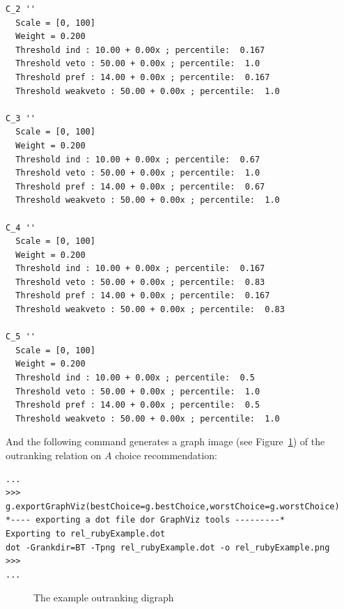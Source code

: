 \documentclass{article}
\newcommand{\+}{\verb+}
\renewcommand{\*}{\back{}}
\newcommand{\Ruby}{{\texorhtml{\sc{Rubis}}{\emph{Rubis}}}\xspace }
\begin{document}
\begin{center}
\begin{example}
\begin{verbatim}
C_2 ''
  Scale = [0, 100]
  Weight = 0.200 
  Threshold ind : 10.00 + 0.00x ; percentile:  0.167
  Threshold veto : 50.00 + 0.00x ; percentile:  1.0
  Threshold pref : 14.00 + 0.00x ; percentile:  0.167
  Threshold weakveto : 50.00 + 0.00x ; percentile:  1.0

C_3 ''
  Scale = [0, 100]
  Weight = 0.200 
  Threshold ind : 10.00 + 0.00x ; percentile:  0.67
  Threshold veto : 50.00 + 0.00x ; percentile:  1.0
  Threshold pref : 14.00 + 0.00x ; percentile:  0.67
  Threshold weakveto : 50.00 + 0.00x ; percentile:  1.0

C_4 ''
  Scale = [0, 100]
  Weight = 0.200 
  Threshold ind : 10.00 + 0.00x ; percentile:  0.167
  Threshold veto : 50.00 + 0.00x ; percentile:  0.83
  Threshold pref : 14.00 + 0.00x ; percentile:  0.167
  Threshold weakveto : 50.00 + 0.00x ; percentile:  0.83

C_5 ''
  Scale = [0, 100]
  Weight = 0.200 
  Threshold ind : 10.00 + 0.00x ; percentile:  0.5
  Threshold veto : 50.00 + 0.00x ; percentile:  1.0
  Threshold pref : 14.00 + 0.00x ; percentile:  0.5
  Threshold weakveto : 50.00 + 0.00x ; percentile:  1.0

\end{verbatim}
\end{example}

And the following  command generates a graph image (see Figure~\ref{fig:ruby}) of the outranking relation on $A$ \Ruby choice recommendation: 
\begin{example}
\begin{verbatim}
...
>>> g.exportGraphViz(bestChoice=g.bestChoice,worstChoice=g.worstChoice)
*---- exporting a dot file dor GraphViz tools ---------*
Exporting to rel_rubyExample.dot
dot -Grankdir=BT -Tpng rel_rubyExample.dot -o rel_rubyExample.png
>>> 
...
\end{verbatim}
\end{example}
\begin{figure}
    \begin{center}{\label{fig:ruby}}
     \caption{The example outranking digraph}
   \end{center}
\end{figure}


\end{center}
\end{document}
